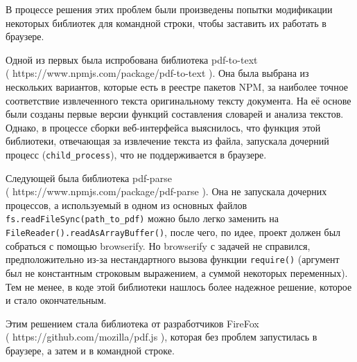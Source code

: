 \documentclass[a4paper,openbib]{report}
\begin{document}
В процессе решения этих проблем были произведены попытки модификации некоторых библиотек для командной строки, чтобы заставить их 
работать в браузере.

Одной из первых была испробована библиотека pdf-to-text \\( https://www.npmjs.com/package/pdf-to-text ). Она была выбрана из нескольких вариантов, которые есть в реестре пакетов NPM, 
за наиболее точное соответствие извлеченного текста оригинальному тексту документа. На её основе были созданы первые версии функций составления словарей и анализа текстов. 
Однако, в процессе сборки веб-интерфейса выяснилось, что функция этой библиотеки, отвечающая за извлечение текста из файла, запускала дочерний процесс (\verb|child_process|), 
что не поддерживается в браузере.

Следующей была библиотека pdf-parse \\( https://www.npmjs.com/package/pdf-parse ). Она не запускала дочерних процессов, а используемый в одном из основных файлов 
\verb|fs.readFileSync(path_to_pdf)| можно было легко заменить на \verb|FileReader().readAsArrayBuffer()|, после чего, по идее, проект должен был собраться 
с помощью browserify. Но browserify с задачей не справился, предположительно из-за нестандартного вызова функции \verb|require()| (аргумент был не константным 
строковым выражением, а суммой некоторых переменных). Тем не менее, в коде этой библиотеки нашлось более надежное решение, которое и стало окончательным.

Этим решением стала библиотека от разработчиков FireFox \\( https://github.com/mozilla/pdf.js ), которая без проблем запустилась в браузере, а затем и в командной 
строке. 
\end{document}
